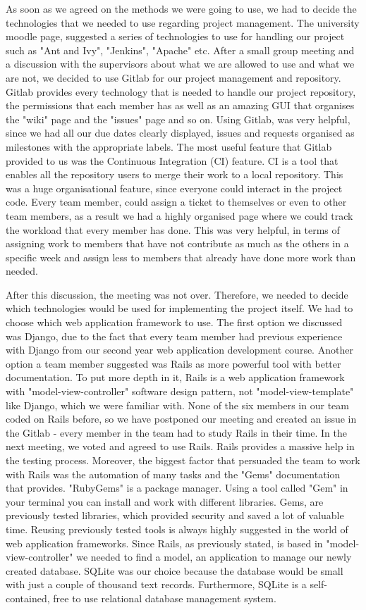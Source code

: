 \documentclass{l3proj}
\begin{document}
As soon as we agreed on the methods we were going to use, we had to decide the technologies that we needed to use regarding project management. The university moodle page, suggested a series of technologies to use for handling our project such as "Ant and Ivy", "Jenkins", "Apache" etc. After a small group meeting and a discussion with the supervisors about what we are allowed to use and what we are not, we decided to use Gitlab for our project management and repository. Gitlab provides every technology that is needed to handle our project repository, the permissions that each member has as well as an amazing GUI that organises the "wiki" page and the "issues" page and so on. Using Gitlab, was very helpful, since we had all our due dates clearly displayed, issues and requests organised as milestones with the appropriate labels. The most useful feature that Gitlab provided to us was the Continuous Integration (CI) feature. CI is a tool that enables all the repository users to merge their work to a local repository. This was a huge organisational feature, since everyone could interact in the project code. Every team member, could assign a ticket to themselves or even to other team members, as a result we had a highly organised page where we could track the workload that every member has done. This was very helpful, in terms of assigning work to members that have not contribute as much as the others in a specific week and assign less to members that already have done more work than needed.

 After this discussion, the meeting was not over. Therefore, we needed to decide which technologies would be used for implementing the project itself. We had to choose which web application framework to use. The first option we discussed was Django, due to the fact that every team member had previous experience with Django from our second year web application development course. Another option a team member suggested was Rails as more powerful tool with better documentation. To put more depth in it, Rails is a web application framework with "model-view-controller" software design pattern, not "model-view-template" like Django, which we were familiar with. None of the six members in our team coded on Rails before, so we have postponed our meeting and created an issue in the Gitlab - every member in the team had to study Rails in their time. In the next meeting, we voted and agreed to use Rails. Rails provides a massive help in the testing process. Moreover, the biggest factor that persuaded the team to work with Rails was the automation of many tasks and the "Gems" documentation that provides. "RubyGems" is a package manager. Using a tool called "Gem" in your terminal you can install and work with different libraries. Gems, are previously tested libraries, which provided security and saved a lot of valuable time. Reusing previously tested tools is always highly suggested in the world of web application frameworks.
  Since Rails, as previously stated, is based in "model-view-controller" we needed to find a model, an application to manage our newly created database. SQLite was our choice because the database would be small with just a couple of thousand text records. Furthermore, SQLite is a self-contained, free to use relational database management system.
 
\end{document}
